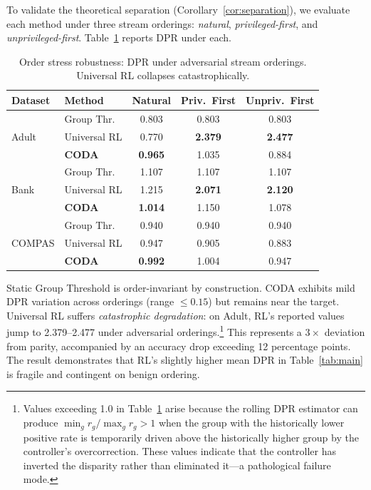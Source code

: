 \documentclass[letterpaper]{article} %
\theoremstyle{definition}
\begin{document}
To validate the theoretical separation (Corollary~\ref{cor:separation}), we evaluate each method under three stream orderings: \emph{natural}, \emph{privileged-first}, and \emph{unprivileged-first}. Table~\ref{tab:orderstress} reports DPR under each.

\begin{table}[t]
\centering
\caption{Order stress robustness: DPR under adversarial stream orderings. Universal RL collapses catastrophically.}
\label{tab:orderstress}
\small
\begin{tabular}{@{}llccc@{}}
\toprule
Dataset & Method & Natural & Priv.\ First & Unpriv.\ First \\
\midrule
\multirow{3}{*}{Adult}
 & Group Thr. & 0.803 & 0.803 & 0.803 \\
 & Universal RL & 0.770 & \textbf{2.379} & \textbf{2.477} \\
 & \textbf{CODA} & \textbf{0.965} & 1.035 & 0.884 \\
\midrule
\multirow{3}{*}{Bank}
 & Group Thr. & 1.107 & 1.107 & 1.107 \\
 & Universal RL & 1.215 & \textbf{2.071} & \textbf{2.120} \\
 & \textbf{CODA} & \textbf{1.014} & 1.150 & 1.078 \\
\midrule
\multirow{3}{*}{COMPAS}
 & Group Thr. & 0.940 & 0.940 & 0.940 \\
 & Universal RL & 0.947 & 0.905 & 0.883 \\
 & \textbf{CODA} & \textbf{0.992} & 1.004 & 0.947 \\
\bottomrule
\end{tabular}
\end{table}

Static Group Threshold is order-invariant by construction. CODA exhibits mild DPR variation across orderings (range $\leq 0.15$) but remains near the target. Universal RL suffers \emph{catastrophic degradation}: on Adult, RL's reported values jump to 2.379--2.477 under adversarial orderings.\footnote{Values exceeding 1.0 in Table~\ref{tab:orderstress} arise because the rolling DPR estimator can produce $\min_g r_g / \max_g r_g > 1$ when the group with the historically lower positive rate is temporarily driven above the historically higher group by the controller's overcorrection. These values indicate that the controller has inverted the disparity rather than eliminated it---a pathological failure mode.} This represents a $3\times$ deviation from parity, accompanied by an accuracy drop exceeding 12 percentage points. The result demonstrates that RL's slightly higher mean DPR in Table~\ref{tab:main} is fragile and contingent on benign ordering.
\end{document}
